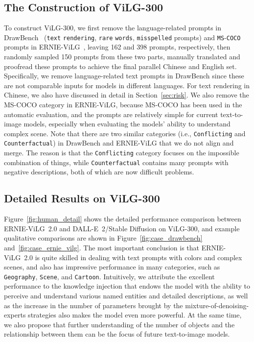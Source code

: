 \documentclass[10pt,twocolumn,letterpaper]{article}
\begin{document}
\subsection{The Construction of ViLG-300}\label{appx:vilg300}
To construct ViLG-300, we first remove the language-related prompts in DrawBench~\cite{DBLP:journals/corr/abs-2205-11487} (\verb|text| \verb|rendering|, \verb|rare| \verb|words|, \verb|misspelled| prompts) and \verb|MS|-\verb|COCO| prompts in ERNIE-ViLG~\cite{DBLP:journals/corr/abs-2112-15283}, leaving 162 and 398 prompts, respectively, then randomly sampled 150 prompts from these two parts, manually translated and proofread these prompts to achieve the final parallel Chinese and English set. 
Specifically, we remove language-related text prompts in DrawBench since these are not comparable inputs for models in different languages. 
For text rendering in Chinese, we 
also have discussed in detail in Section~\ref{sec:risk}. 
We also remove the MS-COCO category in ERNIE-ViLG, because MS-COCO has been used in the automatic evaluation, and the prompts are relatively simple for current text-to-image models, especially when evaluating the models' ability to understand complex scene.
Note that there are two similar categories (i.e., \verb|Conflicting| and \verb|Counterfactual|) in DrawBench and ERNIE-ViLG that we do not align and merge. The reason is that the \verb|Conflicting| category focuses on the impossible combination of things, while \verb|Counterfactual| contains many prompts with negative descriptions, both of which are now difficult problems.




\subsection{Detailed Results on ViLG-300}\label{appx:result}
Figure~\ref{fig:human_detail} shows the detailed performance comparison between ERNIE-ViLG~2.0 and DALL-E~2/Stable Diffusion on ViLG-300, and example qualitative comparisons are shown in Figure~\ref{fig:case_drawbench} and~\ref{fig:case_ernie_vilg}.
The most important conclusion is that ERNIE-ViLG~2.0 is quite skilled in dealing with text prompts with colors and complex scenes, and also has impressive performance in many categories, such as \verb|Geography|, \verb|Scene|, and \verb|Cartoon|.
Intuitively, we attribute the excellent performance to the knowledge injection that endows the model with the ability to perceive and understand various named entities and detailed descriptions, as well as the increase in the number of parameters brought by the mixture-of-denoising-experts strategies also makes the model even more powerful.
At the same time, we also propose that further understanding of the number of objects and the relationship between them can be the focus of future text-to-image models.
\end{document}
